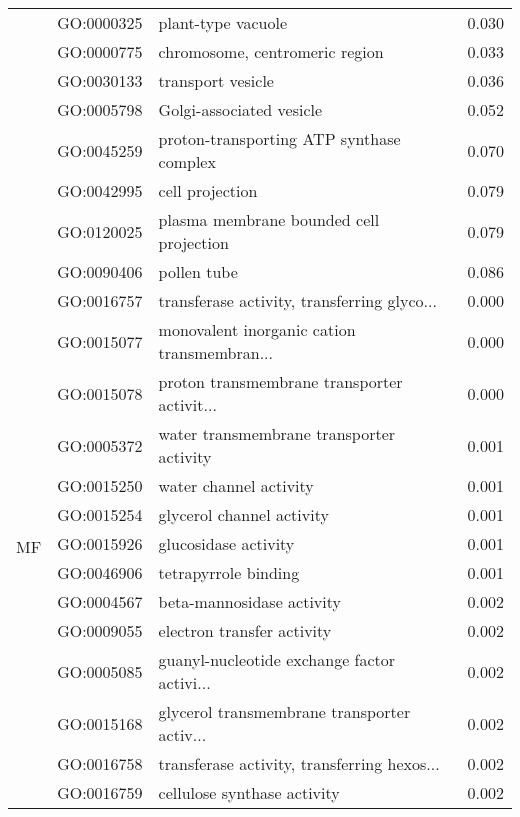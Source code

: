 \begin{longtable}{lllr}
   & GO:0000325 &                           plant-type vacuole &         0.030 \\
   & GO:0000775 &               chromosome, centromeric region &         0.033 \\
   & GO:0030133 &                            transport vesicle &         0.036 \\
   & GO:0005798 &                     Golgi-associated vesicle &         0.052 \\
   & GO:0045259 &     proton-transporting ATP synthase complex &         0.070 \\
   & GO:0042995 &                              cell projection &         0.079 \\
   & GO:0120025 &      plasma membrane bounded cell projection &         0.079 \\
   & GO:0090406 &                                  pollen tube &         0.086 \\
\cline{1-4}
\multirow{72}{*}{MF} & GO:0016757 &  transferase activity, transferring glyco... &         0.000 \\
   & GO:0015077 &  monovalent inorganic cation transmembran... &         0.000 \\
   & GO:0015078 &  proton transmembrane transporter activit... &         0.000 \\
   & GO:0005372 &     water transmembrane transporter activity &         0.001 \\
   & GO:0015250 &                       water channel activity &         0.001 \\
   & GO:0015254 &                    glycerol channel activity &         0.001 \\
   & GO:0015926 &                         glucosidase activity &         0.001 \\
   & GO:0046906 &                         tetrapyrrole binding &         0.001 \\
   & GO:0004567 &                    beta-mannosidase activity &         0.002 \\
   & GO:0009055 &                   electron transfer activity &         0.002 \\
   & GO:0005085 &  guanyl-nucleotide exchange factor activi... &         0.002 \\
   & GO:0015168 &  glycerol transmembrane transporter activ... &         0.002 \\
   & GO:0016758 &  transferase activity, transferring hexos... &         0.002 \\
   & GO:0016759 &                  cellulose synthase activity &         0.002 \\

\end{longtable}
